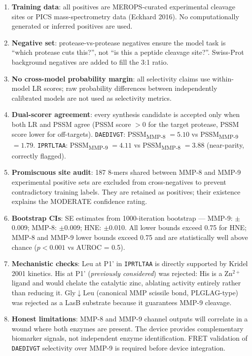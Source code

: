 \documentclass[10pt,a4paper]{article}
\newcommand{\seq}[1]{\texttt{#1}}
\begin{document}
\begin{enumerate}[leftmargin=*,label=\textbf{D\arabic*.},topsep=3pt,itemsep=3pt]

  \item \textbf{Training data}: all positives are MEROPS-curated
    experimental cleavage sites or PICS mass-spectrometry data
    (Eckhard 2016).  No computationally generated or inferred positives
    are used.

  \item \textbf{Negative set}: protease-vs-protease negatives ensure the
    model task is ``which protease cuts this?'', not ``is this a peptide
    cleavage site?''.  Swiss-Prot background negatives are added to fill
    the 3:1 ratio.

  \item \textbf{No cross-model probability margin}: all selectivity
    claims use within-model LR scores; raw probability differences
    between independently calibrated models are not used as selectivity
    metrics.

  \item \textbf{Dual-scorer agreement}: every synthesis candidate is
    accepted only when both LR and PSSM agree (PSSM score $>0$ for the
    target protease, PSSM score lower for off-targets).  \seq{DAEDIVGT}:
    PSSM\textsubscript{MMP-8} $= 5.10$ vs PSSM\textsubscript{MMP-9}
    $= 1.79$.  \seq{IPRTLTAA}: PSSM\textsubscript{MMP-9} $= 4.11$ vs
    PSSM\textsubscript{MMP-8} $= 3.88$ (near-parity, correctly flagged).

  \item \textbf{Promiscuous site audit}: 187 8-mers shared between MMP-8
    and MMP-9 experimental positive sets are excluded from cross-negatives
    to prevent contradictory training labels.  They are retained as
    positives; their existence explains the MODERATE confidence rating.

  \item \textbf{Bootstrap CIs}: SE estimates from 1000-iteration
    bootstrap --- MMP-9: $\pm$0.009; MMP-8: $\pm$0.009; HNE: $\pm$0.010.
    All lower bounds exceed 0.75 for HNE; MMP-8 and MMP-9 lower bounds
    exceed 0.75 and are statistically well above chance ($p < 0.001$
    vs AUROC = 0.5).

  \item \textbf{Mechanistic checks}: Leu at P1' in \seq{IPRTLTAA} is
    directly supported by Kridel 2001 kinetics.  His at P1'
    (\emph{previously considered}) was rejected: His is a Zn$^{2+}$
    ligand and would chelate the catalytic zinc, ablating activity
    entirely rather than reducing it.  Gly$\downarrow$Leu (canonical
    MMP scissile bond, PLGLAG-type) was rejected as a LasB substrate
    because it guarantees MMP-9 cleavage.

  \item \textbf{Honest limitations}: MMP-8 and MMP-9 channel outputs
    will correlate in a wound where both enzymes are present.  The
    device provides complementary biomarker signals, not independent
    enzyme identification.  FRET validation of \seq{DAEDIVGT}
    selectivity over MMP-9 is required before device integration.

\end{enumerate}
\end{document}

